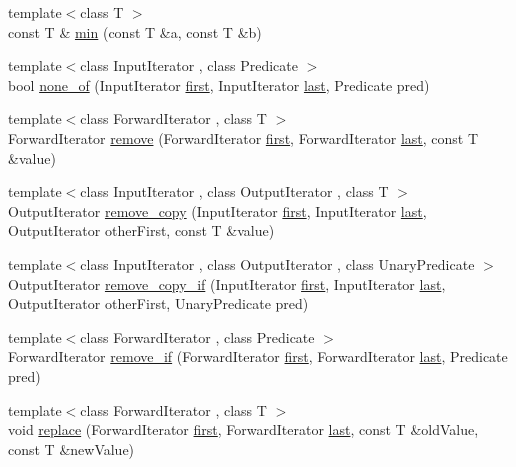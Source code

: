 \begin{DoxyCompactItemize}
\item 
{\footnotesize template$<$class T $>$ }\\const T \& \hyperlink{namespaceprism_a10aff0aca673fb1837069dd8967e4738}{min} (const T \&a, const T \&b)
\item 
{\footnotesize template$<$class Input\+Iterator , class Predicate $>$ }\\bool \hyperlink{namespaceprism_a10c83b433c7f98fd4513f1b68c6db594}{none\+\_\+of} (Input\+Iterator \hyperlink{namespaceprism_ae3fb7a1926a9e8e59300cd5e370470da}{first}, Input\+Iterator \hyperlink{namespaceprism_abe4956c4e865f55ca126b7fb973b5078}{last}, Predicate pred)
\item 
{\footnotesize template$<$class Forward\+Iterator , class T $>$ }\\Forward\+Iterator \hyperlink{namespaceprism_aeddd21943bcf811c56f7d9d1bd4784f6}{remove} (Forward\+Iterator \hyperlink{namespaceprism_ae3fb7a1926a9e8e59300cd5e370470da}{first}, Forward\+Iterator \hyperlink{namespaceprism_abe4956c4e865f55ca126b7fb973b5078}{last}, const T \&value)
\item 
{\footnotesize template$<$class Input\+Iterator , class Output\+Iterator , class T $>$ }\\Output\+Iterator \hyperlink{namespaceprism_ab7b6fb407340e51749169560b48fb20c}{remove\+\_\+copy} (Input\+Iterator \hyperlink{namespaceprism_ae3fb7a1926a9e8e59300cd5e370470da}{first}, Input\+Iterator \hyperlink{namespaceprism_abe4956c4e865f55ca126b7fb973b5078}{last}, Output\+Iterator other\+First, const T \&value)
\item 
{\footnotesize template$<$class Input\+Iterator , class Output\+Iterator , class Unary\+Predicate $>$ }\\Output\+Iterator \hyperlink{namespaceprism_abfc7da1f951e480a26d58fc098b78844}{remove\+\_\+copy\+\_\+if} (Input\+Iterator \hyperlink{namespaceprism_ae3fb7a1926a9e8e59300cd5e370470da}{first}, Input\+Iterator \hyperlink{namespaceprism_abe4956c4e865f55ca126b7fb973b5078}{last}, Output\+Iterator other\+First, Unary\+Predicate pred)
\item 
{\footnotesize template$<$class Forward\+Iterator , class Predicate $>$ }\\Forward\+Iterator \hyperlink{namespaceprism_a2e9d25191ed83ea0a193f16d9c0a00b7}{remove\+\_\+if} (Forward\+Iterator \hyperlink{namespaceprism_ae3fb7a1926a9e8e59300cd5e370470da}{first}, Forward\+Iterator \hyperlink{namespaceprism_abe4956c4e865f55ca126b7fb973b5078}{last}, Predicate pred)
\item 
{\footnotesize template$<$class Forward\+Iterator , class T $>$ }\\void \hyperlink{namespaceprism_a6156070b98de7130b8c912ae3a6d333f}{replace} (Forward\+Iterator \hyperlink{namespaceprism_ae3fb7a1926a9e8e59300cd5e370470da}{first}, Forward\+Iterator \hyperlink{namespaceprism_abe4956c4e865f55ca126b7fb973b5078}{last}, const T \&old\+Value, const T \&new\+Value)

\end{DoxyCompactItemize}
